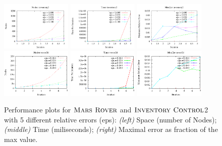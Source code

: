 \begin{figure}[tbp!]
\centering
\includegraphics[width=0.30\textwidth]{Figures/inventory/inventory2Nodes.pdf}
\hspace{3mm}
\includegraphics[width=0.30\textwidth]{Figures/inventory/inventory2Time.pdf}
\hspace{3mm}
\includegraphics[width=0.30\textwidth]{Figures/inventory/inventory2MaxErr.pdf}
\vspace{5mm}
\includegraphics[width=0.30\textwidth]{Figures/rover2D/rover2d-Nodes.eps}
\hspace{3mm}
\includegraphics[width=0.30\textwidth]{Figures/rover2D/rover2d-Time.eps}
\hspace{3mm}
\includegraphics[width=0.30\textwidth]{Figures/rover2D/rover2d-MaxErr.eps}
\vspace{-2mm}
\caption{\footnotesize Performance plots for $\textsc{Mars Rover}$ and $\textsc{Inventory Control}$2 with 5 different relative errors (eps):
{\it (left)}  Space (number of Nodes);
{\it (middle)} Time (miliseconds);
{\it (right)} Maximal error as fraction of the max value.
}
\label{fig:Value}
\vspace{-5mm}
\end{figure}


